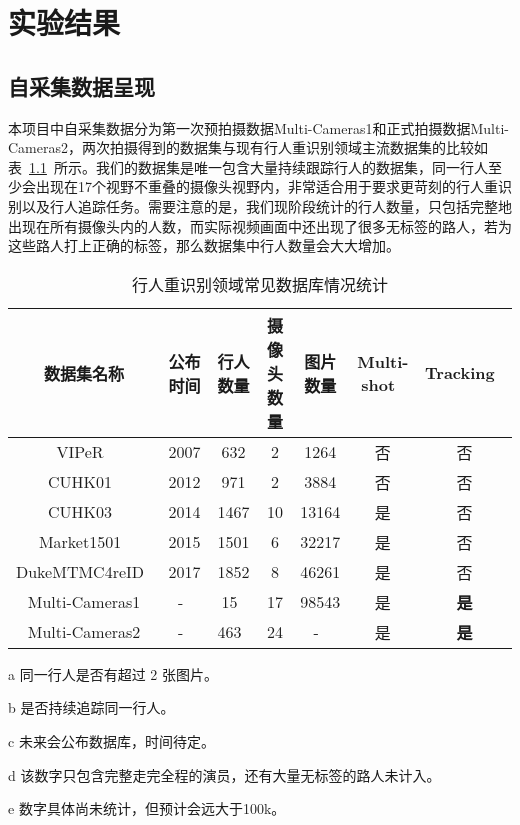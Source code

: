 \chapter{实验结果}\label{sec:experiment}

\section{自采集数据呈现}

本项目中自采集数据分为第一次预拍摄数据Multi-Cameras1和正式拍摄数据Multi-Cameras2，两次拍摄得到的数据集与现有行人重识别领域主流数据集的比较如表~\ref{tab:reiddataset}~所示。我们的数据集是唯一包含大量持续跟踪行人的数据集，同一行人至少会出现在17个视野不重叠的摄像头视野内，非常适合用于要求更苛刻的行人重识别以及行人追踪任务。需要注意的是，我们现阶段统计的行人数量，只包括完整地出现在所有摄像头内的人数，而实际视频画面中还出现了很多无标签的路人，若为这些路人打上正确的标签，那么数据集中行人数量会大大增加。

\begin{table}[!htb]
\centering
\caption{行人重识别领域常见数据库情况统计}
\label{tab:reiddataset}
\begin{threeparttable}
\begin{tabularx}{\textwidth}{ccccccc}
\toprule
数据集名称   & 公布时间 & 行人数量 & 摄像头数量 & 图片数量  & Multi-shot~\tnote{a} & Tracking~\tnote{b} \\ \midrule
VIPeR~\cite{gray2007evaluating}  & 2007 & 632  & 2     & 1264  & 否  & 否 \\
CUHK01~\cite{li2012human} & 2012 & 971  & 2     & 3884  & 否  & 否 \\
CUHK03~\cite{li2014deepreid} & 2014 & 1467 & 10    & 13164 & 是  & 否 \\
Market1501~\cite{zheng2015scalable} & 2015 & 1501 & 6     & 32217 & 是  & 否 \\
DukeMTMC4reID~\cite{gou2017dukemtmc4reid}  & 2017 & 1852 & 8     & 46261 & 是  & 否 \\
Multi-Cameras1 &  -~\tnote{c}   & 15~\tnote{d}   & 17     & 98543 & 是  & \textbf{是} \\
Multi-Cameras2 &  -~\tnote{c}   & 463~\tnote{d} & 24     & -~\tnote{e} & 是  & \textbf{是} \\
\bottomrule
\end{tabularx}
\begin{tablenotes}
    \footnotesize
    \item[a] 同一行人是否有超过 2 张图片。
    \item[b] 是否持续追踪同一行人。
    \item[c] 未来会公布数据库，时间待定。
    \item[d] 该数字只包含完整走完全程的演员，还有大量无标签的路人未计入。
    \item[e] 数字具体尚未统计，但预计会远大于100k。
\end{tablenotes}
\end{threeparttable}
\end{table}

